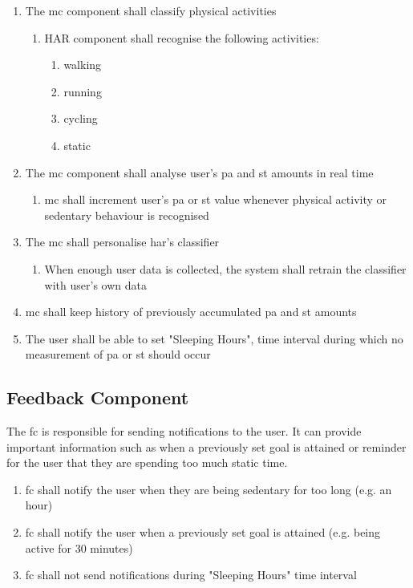     \begin{enumerate}
        \item The \gls{mc} component shall classify physical activities
        \begin{enumerate}
            \item HAR component shall recognise the following activities:
            \begin{enumerate}
                \item walking
                \item running
                \item cycling
                \item static
            \end{enumerate}
        \end{enumerate}
        \item The \gls{mc} component shall analyse user's \gls{pa} and \gls{st} amounts in real time
            \begin{enumerate}
                \item \gls{mc} shall increment user's \gls{pa} or \gls{st} value whenever physical activity or sedentary behaviour is recognised
            \end{enumerate}
        \item The \gls{mc} shall personalise \gls{har}'s classifier
            \begin{enumerate}
                \item When enough user data is collected, the system shall retrain the classifier with user's own data
            \end{enumerate}
            
        \item \gls{mc} shall keep history of previously accumulated \gls{pa} and \gls{st} amounts
        
        \item The user shall be able to set "Sleeping Hours", time interval during which no measurement of \gls{pa} or \gls{st} should occur
      
    \end{enumerate}
    
    \subsection{Feedback Component}
    The \gls{fc} is responsible for sending notifications to the user. It can provide important information such as when a previously set goal is attained or reminder for the user that they are spending too much static time.
    \begin{enumerate}
        \item \gls{fc} shall notify the user when they are being sedentary for too long (e.g. an hour)
        
        \item \gls{fc} shall notify the user when a previously set goal is attained (e.g. being active for 30 minutes)
        
        \item \gls{fc} shall not send notifications during "Sleeping Hours" time interval
    \end{enumerate}

